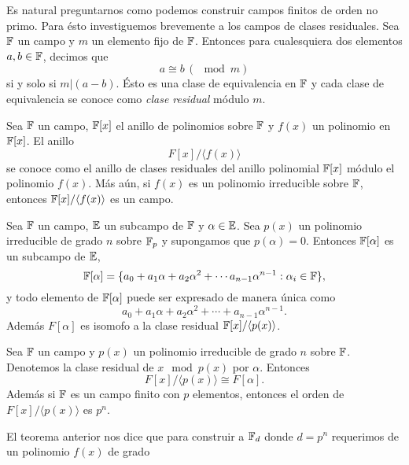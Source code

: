Es natural preguntarnos como podemos construir campos
finitos de orden no primo. Para ésto investiguemos
brevemente a los campos de clases residuales. Sea $\operatorname{\mathbb{F}}$ un
campo y $m$ un elemento fijo de $\operatorname{\mathbb{F}}$. Entonces para
cualesquiera dos elementos $a,b \in \operatorname{\mathbb{F}}$, decimos que
\begin{equation}
  a \cong b \, (\mod m)
\end{equation}
si y solo si $m | (a-b)$. Ésto es una clase de equivalencia
en $\operatorname{\mathbb{F}}$ y cada clase de equivalencia se conoce como
\textit{clase residual} módulo $m$.
\begin{definition}
  Sea $\operatorname{\mathbb{F}}$ un campo, $\operatorname{\mathbb{F}}[x]$ el anillo de polinomios sobre
  $\operatorname{\mathbb{F}}$ y $f(x)$ un polinomio en $\operatorname{\mathbb{F}}[x]$. El anillo
  \[
    F[x] / \langle f(x) \rangle
  \] 
  se conoce como el anillo de clases residuales del anillo
  polinomial $\operatorname{\mathbb{F}}[x]$ módulo el polinomio $f(x)$. Más aún, si
  $f(x)$ es un polinomio irreducible sobre $\operatorname{\mathbb{F}}$, entonces
  $\operatorname{\mathbb{F}}[x] / \langle f(x) \rangle$ es un campo.
\end{definition}
\begin{theorem}
  Sea $\operatorname{\mathbb{F}}$ un campo, $\operatorname{\mathbb{E}}$ un subcampo de $\operatorname{\mathbb{F}}$ y $\alpha \in
  \operatorname{\mathbb{E}}$. Sea $p(x)$ un polinomio irreducible de grado $n$ 
  sobre $\operatorname{\mathbb{F}}_p$ y supongamos que $p(\alpha) = 0$. Entonces
  $\operatorname{\mathbb{F}}[\alpha]$ es un subcampo de $\operatorname{\mathbb{E}}$,
  \begin{equation}
    \operatorname{\mathbb{F}}[\alpha]
    = \{a_0 + a_1\alpha + a_2 \alpha^2 + \cdots a_{n-1}
    \alpha^{n-1} : \alpha_i \in \operatorname{\mathbb{F}}\},
  \end{equation}
  y todo elemento de $\operatorname{\mathbb{F}}[\alpha]$ puede ser expresado de
  manera única como
  \begin{equation}
    a_0 + a_1\alpha + a_2 \alpha^2 + \cdots + a_{n-1}
    \alpha^{n-1}.
  \end{equation}
  Además $F[\alpha]$ es isomofo a la clase residual $\operatorname{\mathbb{F}}[x] /
  \langle p(x) \rangle$.
\end{theorem}
\begin{theorem}
  Sea $\operatorname{\mathbb{F}}$ un campo y $p(x)$ un polinomio irreducible de
  grado $n$ sobre $\operatorname{\mathbb{F}}$. Denotemos la clase residual de $x
  \mod p(x)$ por $\alpha$. Entonces
  \begin{equation}
    F[x] / \langle p(x) \rangle
    \cong F[\alpha].
  \end{equation}
  Además si $\operatorname{\mathbb{F}}$ es un campo finito con $p$ elementos,
  entonces el orden de  $F[x] / \langle p(x) \rangle$ es
  $p^{n}$.
\end{theorem}
El teorema anterior nos dice que para construir a $\operatorname{\mathbb{F}}_d$
donde $d = p^{n}$ requerimos de un polinomio $f(x)$ de grado
